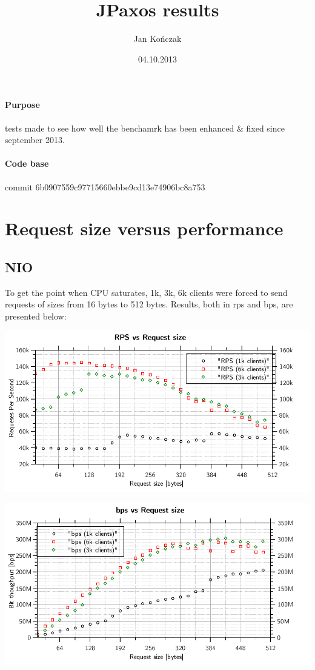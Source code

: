 \documentclass[a4paper,11pt,notitlepage,hidelinks]{article}
\author{Jan Kończak}
\title{JPaxos results}
\date{04.10.2013}
\begin{document}

\paragraph{Purpose} tests made to see how well the benchamrk has been enhanced \& fixed since september 2013.

\paragraph{Code base} commit 6b0907559c97715660ebbe9cd13e74906bc8a753

\section{Request size versus performance}

\subsection{NIO}
\label{nio}

To get the point when CPU saturates, {1k, 3k, 6k} clients were forced to send requests of sizes from 16 bytes to 512 bytes.
Results, both in rps and bps, are presented below:

\noindent\ignorespaces\includegraphics{varsize_rps.pdf}

\noindent\ignorespaces\includegraphics{varsize_bps.pdf}
\end{document}
